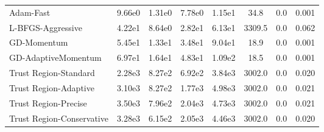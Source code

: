 \documentclass{article}
\begin{document}
\begin{table}[htbp]
{\begin{tabular}{p{2.5cm}*{7}{c}}
Adam-Fast & 9.66e0 & 1.31e0 & 7.78e0 & 1.15e1 & 34.8 & 0.0 & 0.001 \\
L-BFGS-Aggressive & 4.22e1 & 8.64e0 & 2.82e1 & 6.13e1 & 3309.5 & 0.0 & 0.062 \\
GD-Momentum & 5.45e1 & 1.33e1 & 3.48e1 & 9.04e1 & 18.9 & 0.0 & 0.001 \\
GD-AdaptiveMomentum & 6.97e1 & 1.64e1 & 4.83e1 & 1.09e2 & 18.5 & 0.0 & 0.001 \\
Trust Region-Standard & 2.28e3 & 8.27e2 & 6.92e2 & 3.84e3 & 3002.0 & 0.0 & 0.020 \\
Trust Region-Adaptive & 3.10e3 & 8.27e2 & 1.77e3 & 4.98e3 & 3002.0 & 0.0 & 0.021 \\
Trust Region-Precise & 3.50e3 & 7.96e2 & 2.04e3 & 4.73e3 & 3002.0 & 0.0 & 0.021 \\
Trust Region-Conservative & 3.28e3 & 6.15e2 & 2.05e3 & 4.46e3 & 3002.0 & 0.0 & 0.020 \\
\bottomrule
\end{tabular}
}
\end{table}
\end{document}
